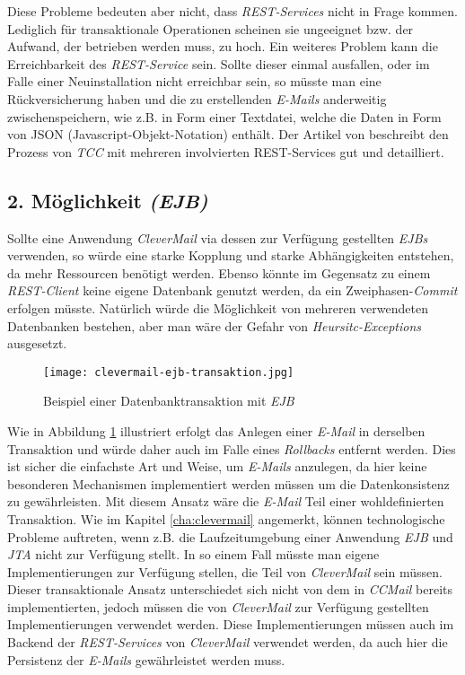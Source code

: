 \newline
\newline
Diese Probleme bedeuten aber nicht, dass \emph{REST-Services} nicht in Frage kommen. Lediglich für transaktionale Operationen scheinen sie ungeeignet bzw. der Aufwand, der betrieben werden muss, zu hoch. Ein weiteres Problem kann die Erreichbarkeit des \emph{REST-Service} sein. Sollte dieser einmal ausfallen, oder im Falle einer Neuinstallation nicht erreichbar sein, so müsste man eine Rückversicherung haben und die zu erstellenden \emph{E-Mails} anderweitig zwischenspeichern, wie z.B. in Form einer Textdatei, welche die Daten in Form von JSON (Javascript-Objekt-Notation) enthält.
\newline
\newline
Der Artikel von \cite{atomikosTcc} beschreibt den Prozess von \emph{TCC} mit mehreren involvierten REST-Services gut und detailliert.

\subsection{2. Möglichkeit \emph{(EJB)}}
Sollte eine Anwendung \emph{CleverMail} via dessen zur Verfügung gestellten \emph{EJBs} verwenden, so würde eine starke Kopplung und starke Abhängigkeiten entstehen, da mehr Ressourcen benötigt werden. Ebenso könnte im Gegensatz zu einem \emph{REST-Client} keine eigene Datenbank genutzt werden, da ein Zweiphasen-\emph{Commit} erfolgen müsste. Natürlich würde die Möglichkeit von mehreren verwendeten Datenbanken bestehen, aber man wäre der Gefahr von \emph{Heursitc-Exceptions} ausgesetzt.
\newpage
\begin{figure}[h]
\centering
\texttt{[image: clevermail-ejb-transaktion.jpg]} %
\caption{Beispiel einer Datenbanktransaktion mit \emph{EJB}}
\label{fig:clevermail-rest-tcc}
\end{figure}
Wie in Abbildung \ref{fig:clevermail-rest-tcc} illustriert erfolgt das Anlegen einer \emph{E-Mail} in derselben Transaktion und würde daher auch im Falle eines \emph{Rollbacks} entfernt werden. Dies ist sicher die einfachste Art und Weise, um \emph{E-Mails} anzulegen, da hier keine besonderen Mechanismen implementiert werden müssen um die Datenkonsistenz zu gewährleisten. Mit diesem Ansatz wäre die \emph{E-Mail} Teil einer wohldefinierten Transaktion.
\newline
\newline
Wie im Kapitel \ref{cha:clevermail} angemerkt, können technologische Probleme auftreten, wenn z.B. die Laufzeitumgebung einer Anwendung \emph{EJB} und \emph{JTA} nicht zur Verfügung stellt. In so einem Fall müsste man eigene Implementierungen zur Verfügung stellen, die Teil von \emph{CleverMail} sein müssen.
\newline
\newline
Dieser transaktionale Ansatz unterschiedet sich nicht von dem in \emph{CCMail} bereits implementierten, jedoch müssen die von \emph{CleverMail} zur Verfügung gestellten Implementierungen verwendet werden. Diese Implementierungen müssen auch im Backend der \emph{REST-Services} von \emph{CleverMail} verwendet werden, da auch hier die Persistenz der \emph{E-Mails} gewährleistet werden muss.
 
